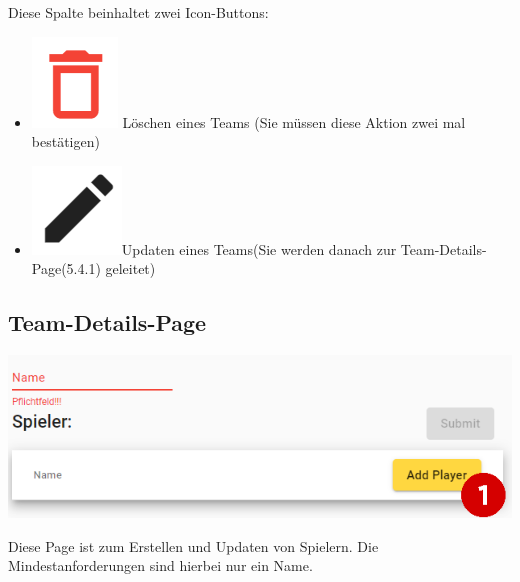 Diese Spalte beinhaltet zwei Icon-Buttons:
\begin{itemize}
    \item \includegraphics[scale=0.3]{pics/user-guide/delete-icon.PNG} Löschen eines Teams (Sie müssen diese Aktion zwei mal bestätigen)
    \item \includegraphics[scale=0.3]{pics/user-guide/edit-icon.PNG}Updaten eines Teams(Sie werden danach zur Team-Details-Page(5.4.1) geleitet)
\end{itemize}

\bigskip
\subsection{Team-Details-Page}
\includegraphics[scale=0.5]{pics/user-guide/team-create-page.PNG}

Diese Page ist zum Erstellen und Updaten von Spielern. Die Mindestanforderungen sind hierbei nur ein Name.

